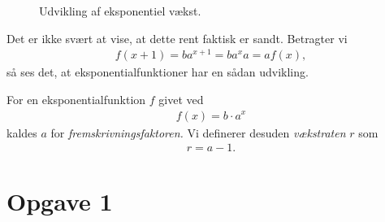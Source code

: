 \begin{figure}[H]
\center
{}
\caption{Udvikling af eksponentiel vækst.}
\label{fig:sildegen}
\end{figure}
Det er ikke svært at vise, at dette rent faktisk er sandt. Betragter vi
\begin{align*}
f(x+1) = ba^{x+1} = ba^xa = af(x),
\end{align*}
så ses det, at eksponentialfunktioner har en sådan udvikling. 
\begin{defn}
	For en eksponentialfunktion $f$ givet ved
	\begin{align*}
		f(x) = b\cdot a^x
	\end{align*}
	kaldes $a$ for \textit{fremskrivningsfaktoren.}
	Vi definerer desuden \textit{vækstraten} $r$ som
	\begin{align*}
		r = a -1.
	\end{align*}
\end{defn}

\section*{Opgave 1}

